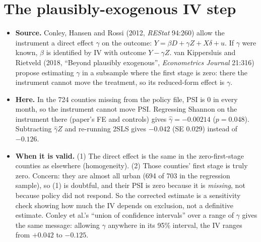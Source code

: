 \documentclass[11pt]{article}
\begin{document}
\section{The plausibly-exogenous IV step}
\begin{itemize}[leftmargin=14pt,itemsep=2pt]
\item \textbf{Source.} Conley, Hansen and Rossi (2012, \textit{REStat} 94:260) allow the instrument a direct effect $\gamma$ on the outcome: $Y = \beta D + \gamma Z + X\delta + u$. If $\gamma$ were known, $\beta$ is identified by IV with outcome $Y-\gamma Z$. van Kippersluis and Rietveld (2018, ``Beyond plausibly exogenous'', \textit{Econometrics Journal} 21:316) propose estimating $\gamma$ in a subsample where the first stage is zero: there the instrument cannot move the treatment, so its reduced-form effect is $\gamma$.
\item \textbf{Here.} In the 724 counties missing from the policy file, PSI is 0 in every month, so the instrument cannot move PSI. Regressing Shannon on the instrument there (paper's FE and controls) gives $\hat\gamma=-0.00214$ ($p=0.048$). Subtracting $\hat\gamma Z$ and re-running 2SLS gives $-0.042$ (SE 0.029) instead of $-0.126$.
\item \textbf{When it is valid.} (1) The direct effect is the same in the zero-first-stage counties as elsewhere (homogeneity). (2) Those counties' first stage is truly zero. Concern: they are almost all urban (694 of 703 in the regression sample), so (1) is doubtful, and their PSI is zero because it is \emph{missing}, not because policy did not respond. So the corrected estimate is a sensitivity check showing how much the IV depends on exclusion, not a definitive estimate. Conley et al.'s ``union of confidence intervals'' over a range of $\gamma$ gives the same message: allowing $\gamma$ anywhere in its 95\% interval, the IV ranges from $+0.042$ to $-0.125$.
\end{itemize}

\end{document}
